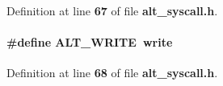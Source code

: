Definition at line {\bf 67} of file {\bf alt\+\_\+syscall.\+h}.

\paragraph[{A\+L\+T\+\_\+\+W\+R\+I\+TE}]{\setlength{\rightskip}{0pt plus 5cm}\#define A\+L\+T\+\_\+\+W\+R\+I\+TE~write}\label{alt__syscall_8h_a659091067b05925f596b8bbf3d59d41c}


Definition at line {\bf 68} of file {\bf alt\+\_\+syscall.\+h}.

